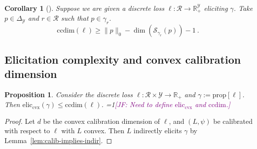 \documentclass{article}
\newcommand{\Comments}{1}
\newcommand{\mynote}[2]{\ifnum\Comments=1\textcolor{#1}{#2}\fi}
\newcommand{\jessie}[1]{\mynote{purple}{[JF: #1]}}
\newcommand{\reals}{\mathbb{R}}
\newcommand{\simplex}{\Delta_\Y}
\newcommand{\prop}[1]{\mathrm{prop}[#1]}
\newcommand{\eliccvx}{\mathrm{elic}_\mathrm{cvx}}
\newcommand{\ccdim}{\mathrm{ccdim}}
\newcommand{\R}{\mathcal{R}}
\renewcommand{\S}{\mathcal{S}}
\newcommand{\Y}{\mathcal{Y}}
\newtheorem{lemma}{Lemma}
\newtheorem{proposition}{Proposition}
\newtheorem{corollary}{Corollary}
\begin{document}
%	
%	

\begin{corollary}[\cite{ramaswamy2016convex}]
	Suppose we are given a discrete loss $\ell:\R \to \reals^\Y_+$ eliciting $\gamma$.
	Take $p \in \simplex$ and $r \in \R$ such that $p \in \gamma_r$.
	\begin{equation}
	\ccdim(\ell) \geq \|p\|_0 - \dim(\S_{\gamma_r}(p)) - 1~.~
	\end{equation}
\end{corollary}

\subsection{Elicitation complexity and convex calibration dimension}

\begin{proposition}
	Consider the discrete loss $\ell : \R \times \Y \to \reals_+$ and $\gamma:= \prop{\ell}$.
	Then $\eliccvx(\gamma) \leq \ccdim(\ell)$.
	\jessie{Need to define $\eliccvx$ and $\ccdim$.}
\end{proposition}
\begin{proof}
	Let $d$ be the convex calibration dimension of $\ell$, and $(L, \psi)$ be calibrated with respect to $\ell$ with $L$ convex.
	Then $L$ indirectly elicits $\gamma$ by Lemma~\ref{lem:calib-implies-indir}.
\end{proof}
\end{document}
